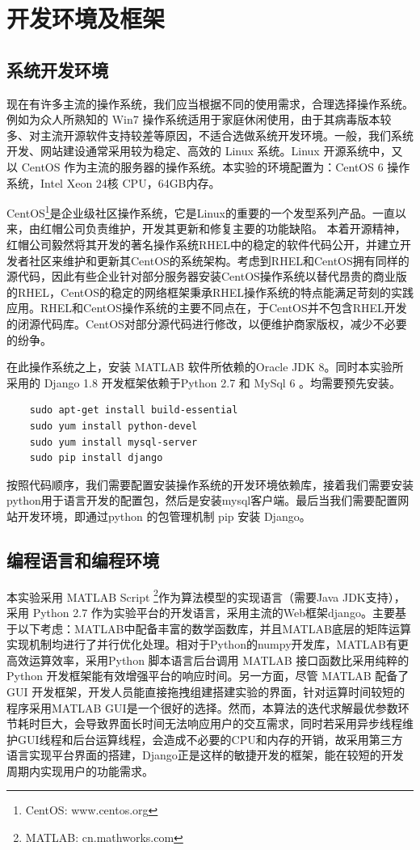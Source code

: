 \documentclass[oneside]{ZJUthesis}
\begin{document}
\chapter{开发环境及框架}
\section{系统开发环境}
现在有许多主流的操作系统，我们应当根据不同的使用需求，合理选择操作系统。例如为众人所熟知的 Win7 操作系统适用于家庭休闲使用，由于其病毒版本较多、对主流开源软件支持较差等原因，不适合选做系统开发环境。一般，我们系统开发、网站建设通常采用较为稳定、高效的 Linux 系统。Linux 开源系统中，又以 CentOS 作为主流的服务器的操作系统。本实验的环境配置为：CentOS 6 操作系统，Intel Xeon 24核 CPU，64GB内存。

CentOS\footnote{CentOS: www.centos.org}是企业级社区操作系统，它是Linux的重要的一个发型系列产品。一直以来，由红帽公司负责维护，开发其更新和修复主要的功能缺陷。 本着开源精神，红帽公司毅然将其开发的著名操作系统RHEL中的稳定的软件代码公开，并建立开发者社区来维护和更新其CentOS的系统架构。考虑到RHEL和CentOS拥有同样的源代码，因此有些企业针对部分服务器安装CentOS操作系统以替代昂贵的商业版的RHEL，CentOS的稳定的网络框架秉承RHEL操作系统的特点能满足苛刻的实践应用。RHEL和CentOS操作系统的主要不同点在，于CentOS并不包含RHEL开发的闭源代码库。CentOS对部分源代码进行修改，以便维护商家版权，减少不必要的纷争。

在此操作系统之上，安装 MATLAB 软件所依赖的Oracle JDK 8。同时本实验所采用的 Django 1.8 开发框架依赖于Python 2.7 和 MySql 6 。均需要预先安装。
\begin{verbatim}
    sudo apt-get install build-essential  
    sudo yum install python-devel         
    sudo yum install mysql-server         
    sudo pip install django               
\end{verbatim}
按照代码顺序，我们需要配置安装操作系统的开发环境依赖库，接着我们需要安装python用于语言开发的配置包，然后是安装mysql客户端。最后当我们需要配置网站开发环境，即通过python 的包管理机制 pip 安装 Django。

\section{编程语言和编程环境}
本实验采用 MATLAB Script \footnote{MATLAB: cn.mathworks.com}作为算法模型的实现语言（需要Java JDK支持），采用 Python 2.7 作为实验平台的开发语言，采用主流的Web框架django。主要基于以下考虑：MATLAB中配备丰富的数学函数库，并且MATLAB底层的矩阵运算实现机制均进行了并行优化处理\cite{刘卫国2002按对象分层决策矩阵的逼近理想解法的}。相对于Python的numpy开发库，MATLAB有更高效运算效率，采用Python 脚本语言后台调用 MATLAB 接口函数比采用纯粹的 Python 开发框架能有效增强平台的响应时间。另一方面，尽管 MATLAB 配备了 GUI 开发框架，开发人员能直接拖拽组建搭建实验的界面，针对运算时间较短的程序采用MATLAB GUI是一个很好的选择。然而，本算法的迭代求解最优参数环节耗时巨大，会导致界面长时间无法响应用户的交互需求，同时若采用异步线程维护GUI线程和后台运算线程，会造成不必要的CPU和内存的开销，故采用第三方语言实现平台界面的搭建，Django正是这样的敏捷开发的框架，能在较短的开发周期内实现用户的功能需求。
\end{document}
